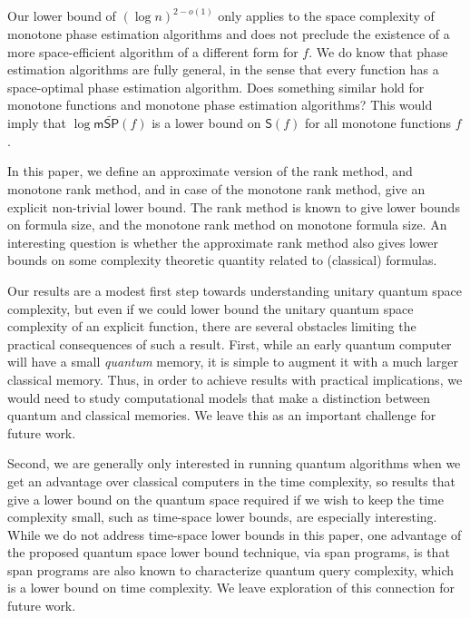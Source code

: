 \documentclass[11pt]{article}
\numberwithin{equation}{section}
\theoremstyle{definition}
\theoremstyle{plain}
\begin{document}
Our lower bound of $(\log n)^{2-o(1)}$ only applies to the space complexity of monotone phase estimation algorithms and does not preclude the existence of a more space-efficient algorithm of a different form for $f$. We do know that phase estimation algorithms are fully general, in the sense that every function has a space-optimal phase estimation algorithm. Does something similar hold for monotone functions and monotone phase estimation algorithms? This would imply that $\log\mathsf{m}\widetilde{\mathsf{SP}}(f)$ is a lower bound on $\mathsf{S}(f)$ for all monotone functions $f$. 

In this %
paper,  %
we define an approximate version of the rank method, and monotone rank method, and in case of the monotone rank method, give an explicit non-trivial lower bound. The rank method is known to give lower bounds on formula size, and the monotone rank method on monotone formula size. An interesting question is whether the approximate rank method also gives lower bounds on some complexity theoretic quantity related to (classical) formulas. 

Our results are a modest first step towards understanding unitary quantum space complexity, but even if we could lower bound the unitary quantum space complexity of an explicit function, there are several obstacles limiting the practical consequences of such a result. First, while an early quantum computer will have a small \emph{quantum} memory, it is simple to augment it with a much larger classical memory. Thus, in order to achieve results with practical implications, we would need to study computational models that make a distinction between quantum and classical memories. We leave this as an important challenge for future work. 

Second, we are generally only interested in running quantum algorithms when we get an advantage over classical computers in the time complexity, so results that give a lower bound on the quantum space required if we wish to keep the time complexity small, such as time-space lower bounds, are especially interesting. While we do not address time-space lower bounds in this paper, one advantage of the proposed quantum space lower bound technique, via span programs, is that span programs are also known to characterize quantum query complexity, which is a lower bound on time complexity. We leave exploration of this connection for future work. 
\end{document}
